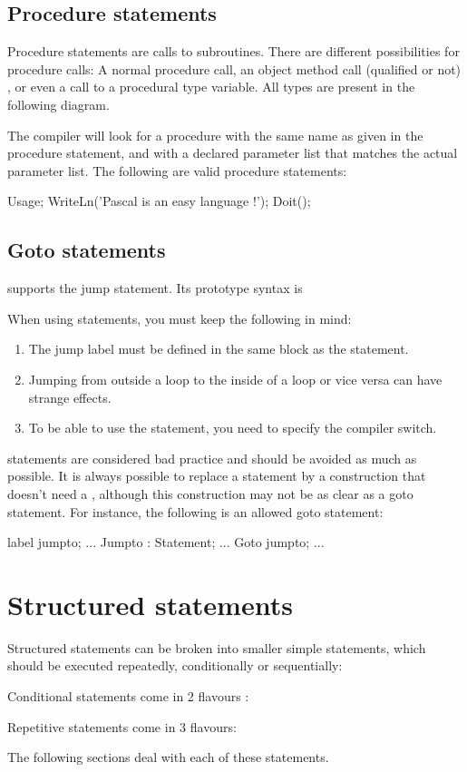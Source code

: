 \documentclass{report}
\begin{document}
\subsection{Procedure statements}
Procedure statements are calls to subroutines. There are
different possibilities for procedure calls: A normal procedure call, an
object method call (qualified or not) , or even a call to a procedural 
type variable. All types are present in the following diagram.

The \fpc compiler will look for a procedure with the same name as given in
the procedure statement, and with a declared parameter list that matches the
actual parameter list.
The following are valid procedure statements:
\begin{listing}
Usage;
WriteLn('Pascal is an easy language !');  
Doit();
\end{listing}
\subsection{Goto statements}
\fpc supports the  jump statement. Its prototype syntax is

When using  statements, you must keep the following in mind:
\begin{enumerate}
\item The jump label must be defined in the same block as the 
statement.
\item Jumping from outside a loop to the inside of a loop or vice versa can
 have strange effects.
\item To be able to use the  statement, you need to specify the 
 compiler switch.
\end{enumerate}
 statements are considered bad practice and should be avoided as
much as possible. It is always possible to replace a  statement by a
construction that doesn't need a , although this construction may 
not be as clear as a goto statement.
For instance, the following is an allowed goto statement:
\begin{listing}
label
  jumpto;
...
Jumpto : 
  Statement;
...
Goto jumpto;
...
\end{listing}
\section{Structured statements}
Structured statements can be broken into smaller simple statements, which
should be executed repeatedly, conditionally  or sequentially:

Conditional statements come in 2 flavours : 

Repetitive statements come in 3 flavours:

The following sections deal with each of these statements.
\end{document}
